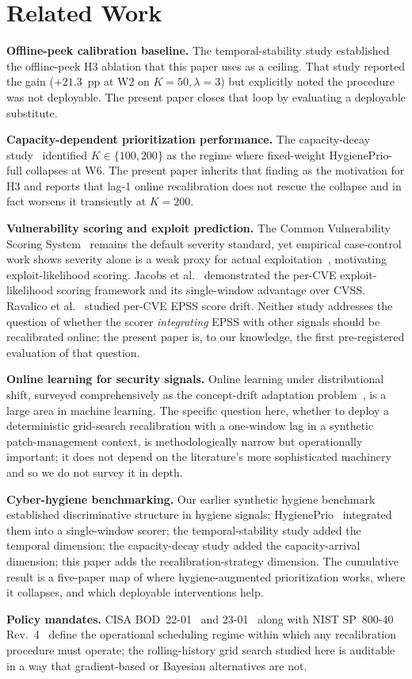 \section{Related Work}

\textbf{Offline-peek calibration baseline.} The temporal-stability study
established the offline-peek H3 ablation that this paper uses as a
ceiling. That study reported the gain ($+21.3$~pp at W2 on $K=50,
\lambda=3$) but explicitly noted the procedure was not deployable.
The present paper closes that loop by evaluating a deployable
substitute.

\textbf{Capacity-dependent prioritization performance.}
The capacity-decay study~\cite{paper6capacity} identified $K \in \{100, 200\}$ as
the regime where fixed-weight HygienePrio-full collapses at W6.
The present paper inherits that finding as the motivation for
H3 and reports that lag-1 online recalibration does not rescue
the collapse and in fact worsens it transiently at $K = 200$.

\textbf{Vulnerability scoring and exploit prediction.} The Common
Vulnerability Scoring System~\cite{mell2007cvss} remains the default
severity standard, yet empirical case-control work shows severity alone
is a weak proxy for actual exploitation~\cite{allodi2014comparing},
motivating exploit-likelihood scoring. Jacobs
et al.~\cite{jacobs2021epss,jacobs2020improving}
demonstrated the per-CVE exploit-likelihood scoring framework and
its single-window advantage over CVSS. Ravalico
et al.~\cite{ravalico2025epsstemporal} studied per-CVE EPSS score
drift. Neither study addresses the question of whether the scorer
\textit{integrating} EPSS with other signals should be recalibrated
online; the present paper is, to our knowledge, the first
pre-registered evaluation of that question.

\textbf{Online learning for security signals.} Online learning under
distributional shift, surveyed comprehensively as the concept-drift
adaptation problem~\cite{gama2014survey}, is a large area in machine
learning. The
specific question here, whether to deploy a deterministic
grid-search recalibration with a one-window lag in a synthetic
patch-management context, is methodologically narrow but
operationally important; it does not depend on the literature's
more sophisticated machinery and so we do not survey it in depth.

\textbf{Cyber-hygiene benchmarking.} Our earlier synthetic hygiene
benchmark established discriminative structure in hygiene signals;
HygienePrio~\cite{paper4hygieneprio} integrated them into a single-window
scorer; the temporal-stability study added the temporal dimension; the capacity-decay study added the
capacity-arrival dimension; this paper adds the recalibration-strategy
dimension. The cumulative result is a five-paper map of where
hygiene-augmented prioritization works, where it collapses, and
which deployable interventions help.

\textbf{Policy mandates.} CISA BOD~22-01~\cite{cisa2021bod2201} and
23-01~\cite{cisa2022bod2301} along with NIST
SP~800-40 Rev.~4~\cite{nist2022sp80040r4} define the operational
scheduling regime within which any recalibration procedure must
operate; the rolling-history grid search studied here is auditable
in a way that gradient-based or Bayesian alternatives are not.
